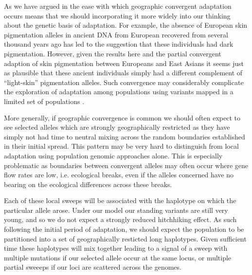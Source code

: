 \documentclass{article}
\begin{document}
As we have argued in \citet{ralph2010parallel} the ease with which
geographic convergent adaptation occurs means that we should
incorporating it more widely into our thinking about the genetic basis
of adaptation. For example, the absence of European skin pigmentation alleles in
ancient DNA from European recovered from several thousand years ago
has led to the suggestion that these individuals had dark
pigmentation. However, given the results here and the partial convergent
adaption of skin pigmentation between Europeans and East Asians
\citep{} it seems just as plausible that these ancient individuals
simply had a different complement of ``light-skin'' pigmentation
alleles. Such convergence may considerably complicate the 
exploration of adaptation among populations using variants mapped in a
limited set of populations \citep{BergCoop:14}.

More generally, if geographic convergence is common we should often expect to see
selected alleles which are strongly geographically restricted as they
have simply not had time to neutral mixing across the random boundaries
established in their initial spread. This pattern may be very hard to
distinguish from local adaptation using population genomic approaches
alone. This is especially problematic as boundaries between convergent alleles may often
occur where gene flow rates are low, i.e. ecological breaks, even if
the alleles concerned have no bearing on the ecological differences
across these breaks. 

Each of these local sweeps will be associated with the haplotype on
which the particular allele arose. Under our model our standing
variants are still very young, and so we do not expect a strongly
reduced hitchhiking effect. As such following the initial period of
adaptation, we should expect the population to be partitioned into a
set of geographically resticted long haplotypes. Given sufficient time
these haplotypes will mix together leading to a signal of a sweep with
multiple mutations if our selected allele occur at the same locus, or
multiple partial sweeeps if our loci are scattered across the genomes.
\end{document}
